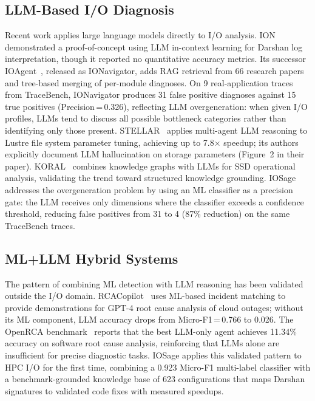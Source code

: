 \subsection{LLM-Based I/O Diagnosis}
Recent work applies large language models directly to I/O analysis.
ION~\cite{egersdoerfer2024ion} demonstrated a proof-of-concept using LLM
in-context learning for Darshan log interpretation, though it reported
no quantitative accuracy metrics.
Its successor IOAgent~\cite{egersdoerfer2025ioagent}, released as
IONavigator, adds RAG retrieval from 66 research papers and tree-based
merging of per-module diagnoses.
On 9 real-application traces from TraceBench, IONavigator produces 31 false
positive diagnoses against 15 true positives (Precision\,=\,0.326),
reflecting LLM overgeneration: when given I/O profiles, LLMs tend to discuss
all possible bottleneck categories rather than identifying only those present.
STELLAR~\cite{egersdoerfer2025stellar} applies multi-agent LLM reasoning
to Lustre file system parameter tuning, achieving up to 7.8$\times$ speedup;
its authors explicitly document LLM hallucination on storage parameters
(Figure~2 in their paper).
KORAL~\cite{akewar2026koral} combines knowledge graphs with LLMs for SSD
operational analysis, validating the trend toward structured knowledge
grounding.
IOSage addresses the overgeneration problem by using an ML classifier as a
precision gate: the LLM receives only dimensions where the classifier
exceeds a confidence threshold, reducing false positives from 31 to 4
(87\% reduction) on the same TraceBench traces.

\subsection{ML+LLM Hybrid Systems}
The pattern of combining ML detection with LLM reasoning has been validated
outside the I/O domain.
RCACopilot~\cite{chen2024rcacopilot} uses ML-based incident matching to
provide demonstrations for GPT-4 root cause analysis of cloud outages;
without its ML component, LLM accuracy drops from
Micro-F1\,=\,0.766 to 0.026.
The OpenRCA benchmark~\cite{openrca2025} reports that the best LLM-only agent
achieves 11.34\% accuracy on software root cause analysis, reinforcing
that LLMs alone are insufficient for precise diagnostic tasks.
IOSage applies this validated pattern to HPC I/O for the first time,
combining a 0.923 Micro-F1 multi-label classifier with a benchmark-grounded
knowledge base of 623 configurations that maps Darshan signatures to
validated code fixes with measured speedups.
